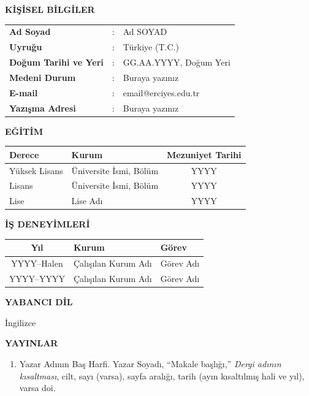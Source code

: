 \textbf{KİŞİSEL BİLGİLER}
\vspace*{-5mm}
\renewcommand{\arraystretch}{1.0}
\begin{table}[h]
\begin{tabular}{p{4cm}ll}
\textbf{Ad Soyad} & : & Ad SOYAD \\
\textbf{Uyruğu} & : & Türkiye (T.C.) \\
\textbf{Doğum Tarihi ve Yeri} & : & GG.AA.YYYY, Doğum Yeri \\
\textbf{Medeni Durum} & : & Buraya yazınız \\
\textbf{E-mail} & : & email@erciyes.edu.tr \\ 
\textbf{Yazışma Adresi} & : & Buraya yazınız \\
\end{tabular}
\end{table}


\textbf{EĞİTİM}
\vspace*{-2mm}
\begin{table}[htbp]
\centering
\begin{tabularx}{\textwidth}{|l|X|c|}
\hline
\textbf{Derece} & \textbf{Kurum} & \textbf{Mezuniyet Tarihi} \\ \hline
Yüksek Lisans & Üniversite İsmi, Bölüm & YYYY \\ \hline
Lisans & Üniversite İsmi, Bölüm & YYYY \\ \hline
Lise & Lise Adı & YYYY \\ \hline
\end{tabularx}
\end{table}


\textbf{İŞ DENEYİMLERİ}
\vspace*{-2mm}
\begin{table}[h]
\centering
\begin{tabularx}{\textwidth}{|c|X|l|}
\hline
\textbf{Yıl} & \textbf{Kurum} & \textbf{Görev} \\ \hline
YYYY–Halen & Çalışılan Kurum Adı & Görev Adı \\ \hline
YYYY–YYYY & Çalışılan Kurum Adı & Görev Adı \\ \hline
\end{tabularx}
\end{table}


\textbf{YABANCI DİL}

İngilizce
\vspace*{5mm}


\textbf{YAYINLAR}
\vspace*{-7mm}
\begin{enumerate}

\item Yazar Adının Baş Harfi. Yazar Soyadı, “Makale başlığı,” \textit{Dergi adının kısaltması}, cilt,
sayı (varsa), sayfa aralığı, tarih (ayın kısaltılmış hali ve yıl), varsa doi.

\end{enumerate}